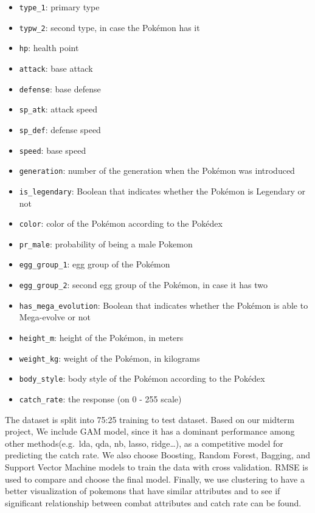 \documentclass[
]{article}
\providecommand{\tightlist}{%
  \setlength{\itemsep}{0pt}\setlength{\parskip}{0pt}}
\begin{document}
\begin{itemize}
\tightlist
\item
  \texttt{type\_1}: primary type
\item
  \texttt{typw\_2}: second type, in case the Pokémon has it
\item
  \texttt{hp}: health point
\item
  \texttt{attack}: base attack
\item
  \texttt{defense}: base defense
\item
  \texttt{sp\_atk}: attack speed
\item
  \texttt{sp\_def}: defense speed
\item
  \texttt{speed}: base speed
\item
  \texttt{generation}: number of the generation when the Pokémon was
  introduced
\item
  \texttt{is\_legendary}: Boolean that indicates whether the Pokémon is
  Legendary or not
\item
  \texttt{color}: color of the Pokémon according to the Pokédex
\item
  \texttt{pr\_male}: probability of being a male Pokemon
\item
  \texttt{egg\_group\_1}: egg group of the Pokémon
\item
  \texttt{egg\_group\_2}: second egg group of the Pokémon, in case it
  has two
\item
  \texttt{has\_mega\_evolution}: Boolean that indicates whether the
  Pokémon is able to Mega-evolve or not
\item
  \texttt{height\_m}: height of the Pokémon, in meters
\item
  \texttt{weight\_kg}: weight of the Pokémon, in kilograms
\item
  \texttt{body\_style}: body style of the Pokémon according to the
  Pokédex
\item
  \texttt{catch\_rate}: the response (on 0 - 255 scale)
\end{itemize}

The dataset is split into 75:25 training to test dataset. Based on our
midterm project, We include GAM model, since it has a dominant
performance among other methods(e.g.~lda, qda, nb, lasso, ridge\ldots),
as a competitive model for predicting the catch rate. We also choose
Boosting, Random Forest, Bagging, and Support Vector Machine models to
train the data with cross validation. RMSE is used to compare and choose
the final model. Finally, we use clustering to have a better
visualization of pokemons that have similar attributes and to see if
significant relationship between combat attributes and catch rate can be
found.
\end{document}
